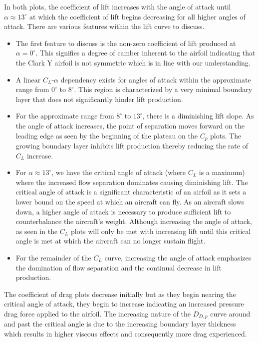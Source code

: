 \documentclass[runningheads]{llncs}
\begin{document}
\noindent
In both plots, the coefficient of lift increases with the angle of attack until $\alpha\approx13^\circ$ at which the coefficient of lift begins decreasing for all higher angles of attack. There are various features within the lift curve to discuss.

\begin{itemize}

    \item The first feature to discuss is the non-zero coefficient of lift produced at $\alpha=0^\circ$. This signifies a degree of camber inherent to the airfoil indicating that the Clark Y airfoil is not symmetric which is in line with our understanding.
    
    \item A linear $C_L$-$\alpha$ dependency exists for angles of attack within the approximate range from $0^\circ$ to $8^\circ$. This region is characterized by a very minimal boundary layer that does not significantly hinder lift production.
    
    \item For the approximate range from $8^\circ$ to $13^\circ$, there is a diminishing lift slope. As the angle of attack increases, the point of separation moves forward on the leading edge as seen by the beginning of the plateau on the $C_p$ plots. The growing boundary layer inhibits lift production thereby reducing the rate of $C_L$ increase.
    
    \item For $\alpha\approx13^\circ$, we have the critical angle of attack (where $C_L$ is a maximum) where the increased flow separation dominates causing diminishing lift. The critical angle of attack is a significant characteristic of an airfoil as it sets a lower bound on the speed at which an aircraft can fly. As an aircraft slows down, a higher angle of attack is necessary to produce sufficient lift to counterbalance the aircraft's weight. Although increasing the angle of attack, as seen in the $C_L$ plots will only be met with increasing lift until this critical angle is met at which the aircraft can no longer sustain flight.
    
    \item For the remainder of the $C_L$ curve, increasing the angle of attack emphasizes the domination of flow separation and the continual decrease in lift production.
\end{itemize}

\noindent
The coefficient of drag plots decrease initially but as they begin nearing the critical angle of attack, they begin to increase indicating an increased pressure drag force applied to the airfoil. The increasing nature of the $D_{D,p}$ curve around and past the critical angle is due to the increasing boundary layer thickness which results in higher viscous effects and consequently more drag experienced.\newline
\end{document}
